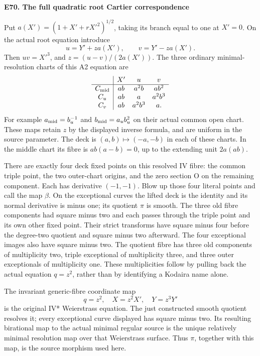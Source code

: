 \par

\medskip\noindent\textbf{E70. The full quadratic root Cartier correspondence}

\par\nobreak

Put \(a(X')=(1+X'+rX'^2)^{1/2}\), taking its branch equal to one
at \(X'=0\). On the actual root equation introduce
\[
u=Y'+za(X'),\qquad v=Y'-za(X').
\]
Then \(uv=X'^3\), and \(z=(u-v)/(2a(X'))\). The three ordinary
minimal-resolution charts of this A2 equation are
\[
\begin{array}{c|ccc}
 &X'&u&v\\ \hline
C_{\rm mid}&ab&a^2b&ab^2\\
C_u&ab&a&a^2b^3\\
C_v&ab&a^2b^3&a .
\end{array}
\]
For example \(a_{\rm mid}=b_u^{-1}\) and
\(b_{\rm mid}=a_u b_u^2\) on their actual common open chart.
These maps retain \(z\) by the displayed inverse formula, and are
uniform in the source parameter. The deck is \((a,b)\mapsto(-a,-b)\)
in each of these charts. In the middle chart its fibre is
\(ab(a-b)=0\), up to the extending unit \(2a(ab)\).

There are exactly four deck fixed points on this resolved IV
fibre: the common triple point, the two outer-chart origins, and
the zero section O on the remaining component. Each has derivative
\((-1,-1)\). Blow up those four literal points and call the map
\(\beta\). On the exceptional curves the lifted deck is the identity
and its normal derivative is minus one; its quotient \(\pi\) is
smooth. The three old fibre components had square minus two and
each passes through the triple point and its own other fixed point.
Their strict transforms have square minus four before the degree-two
quotient and square minus two afterward. The four exceptional images
also have square minus two. The quotient fibre has three old
components of multiplicity two, triple exceptional of multiplicity
three, and three outer exceptionals of multiplicity one. These
multiplicities follow by pulling back the actual equation \(q=z^2\),
rather than by identifying a Kodaira name alone.

The invariant generic-fibre coordinate map
\[
q=z^2,\quad X=z^2X',\quad Y=z^3Y'
\]
is the original IV* Weierstrass equation. The just constructed smooth
quotient resolves it; every exceptional curve displayed has square
minus two. Its resulting birational map to the actual minimal
regular source is the unique relatively minimal resolution map over
that Weierstrass surface. Thus \(\pi\), together with this map, is
the source morphism used here.

